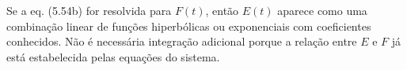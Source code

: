 Se a eq. (5.54b) for resolvida para $F(t)$, então $E(t)$ aparece como uma combinação linear de funções hiperbólicas ou exponenciais com coeficientes conhecidos. Não é necessária integração adicional porque a relação entre $E$ e $F$ já está estabelecida pelas equações do sistema. 